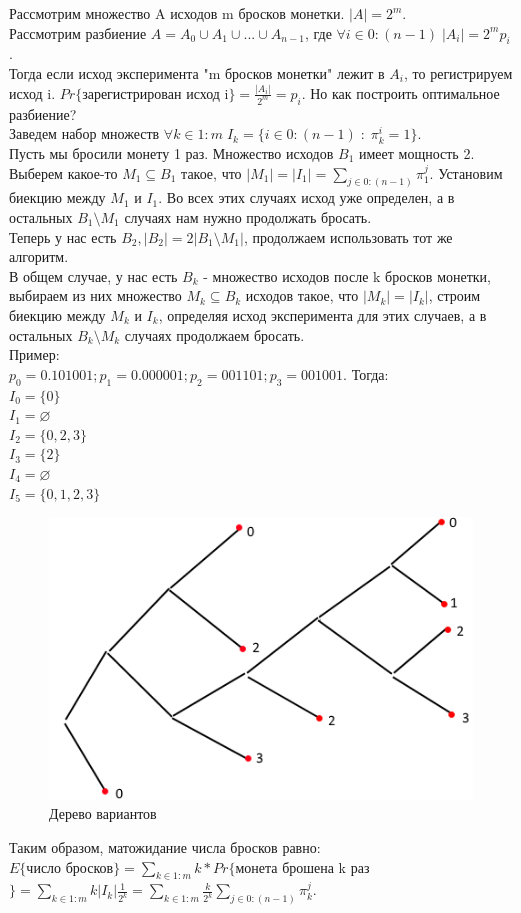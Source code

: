 Рассмотрим множество A исходов m бросков монетки. $|A| = 2^m$.\\
Рассмотрим разбиение $A = A_0 \cup A_1 \cup ... \cup A_{n - 1}$, где $\forall i \in 0:(n - 1) \; |A_i| = 2^mp_i$.\\
Тогда если исход эксперимента "m бросков монетки" лежит в $A_i$, то регистрируем исход i. $Pr\{$зарегистрирован исход i$\} = \frac{|A_i|}{2^m} = p_i$. Но как построить оптимальное разбиение?\\
Заведем набор множеств $\forall k \in 1:m \; I_k = \{i \in 0:(n - 1) \; : \; \pi^i_k = 1\}$.\\
Пусть мы бросили монету 1 раз. Множество исходов $B_1$ имеет мощность 2. Выберем какое-то $M_1 \subseteq B_1$ такое, что $|M_1| = |I_1| = \sum\limits_{j \in 0:(n - 1)}\pi^j_1$. Установим биекцию между $M_1$ и $I_1$. Во всех этих случаях исход уже определен, а в остальных $B_1 \setminus M_1$ случаях нам нужно продолжать бросать.\\
Теперь у нас есть $B_2, |B_2| = 2|B_1 \setminus M_1|$, продолжаем использовать тот же алгоритм.\\
В общем случае, у нас есть $B_k$ - множество исходов после k бросков монетки, выбираем из них множество $M_k \subseteq B_k$ исходов такое, что $|M_k| = |I_k|$, строим биекцию между $M_k$ и $I_k$, определяя исход эксперимента для этих случаев, а в остальных $B_k \setminus M_k$ случаях продолжаем бросать.\\
Пример:\\
$p_0 = 0.101001; p_1 = 0.000001; p_2 = 001101; p_3 = 001001$. Тогда:\\
$I_0 = \{0\}$\\
$I_1 = \varnothing$\\
$I_2 = \{0, 2, 3\}$\\
$I_3 = \{2\}$\\
$I_4 = \varnothing$\\
$I_5 = \{0, 1, 2, 3\}$\\
\begin{figure}[H]
\includegraphics[width=\linewidth]{Bits2.png}
\caption{Дерево вариантов}
\label{fig:Bits2}
\end{figure}
Таким образом, матожидание числа бросков равно:\\
$E\{$число бросков$\} = \sum\limits_{k \in 1:m}k * Pr\{$монета брошена k раз$\} = \sum\limits_{k \in 1:m}k|I_k|\frac{1}{2^k} = \sum\limits_{k \in 1:m}\frac{k}{2^k}\sum\limits_{j \in 0:(n - 1)}\pi^j_k$.
 